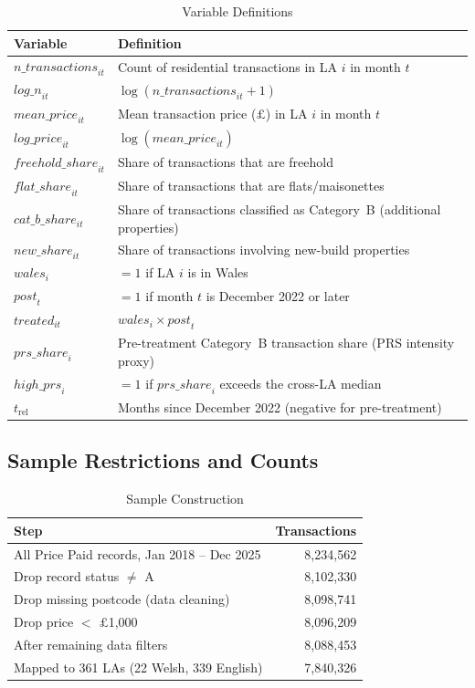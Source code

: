 \documentclass[12pt]{article}
\begin{document}
\begin{table}[H]
\centering
\caption{Variable Definitions}
\label{tab:vardefs}
\begin{tabular}{lp{10cm}}
\toprule
Variable & Definition \\
\midrule
$\mathit{n\_transactions}_{it}$ & Count of residential transactions in LA $i$ in month $t$ \\
$\mathit{log\_n}_{it}$ & $\log(\mathit{n\_transactions}_{it} + 1)$ \\
$\mathit{mean\_price}_{it}$ & Mean transaction price ($\pounds$) in LA $i$ in month $t$ \\
$\mathit{log\_price}_{it}$ & $\log(\mathit{mean\_price}_{it})$ \\
$\mathit{freehold\_share}_{it}$ & Share of transactions that are freehold \\
$\mathit{flat\_share}_{it}$ & Share of transactions that are flats/maisonettes \\
$\mathit{cat\_b\_share}_{it}$ & Share of transactions classified as Category~B (additional properties) \\
$\mathit{new\_share}_{it}$ & Share of transactions involving new-build properties \\
$\mathit{wales}_i$ & $= 1$ if LA $i$ is in Wales \\
$\mathit{post}_t$ & $= 1$ if month $t$ is December 2022 or later \\
$\mathit{treated}_{it}$ & $\mathit{wales}_i \times \mathit{post}_t$ \\
$\mathit{prs\_share}_i$ & Pre-treatment Category~B transaction share (PRS intensity proxy) \\
$\mathit{high\_prs}_i$ & $= 1$ if $\mathit{prs\_share}_i$ exceeds the cross-LA median \\
$t_{\text{rel}}$ & Months since December 2022 (negative for pre-treatment) \\
\bottomrule
\end{tabular}
\end{table}

\subsection{Sample Restrictions and Counts}

\begin{table}[H]
\centering
\caption{Sample Construction}
\label{tab:sample}
\begin{tabular}{lr}
\toprule
Step & Transactions \\
\midrule
All Price Paid records, Jan 2018 -- Dec 2025 & 8,234,562 \\
Drop record status $\neq$ A & 8,102,330 \\
Drop missing postcode (data cleaning) & 8,098,741 \\
Drop price $<$ $\pounds$1,000 & 8,096,209 \\
After remaining data filters & 8,088,453 \\
Mapped to 361 LAs (22 Welsh, 339 English) & 7,840,326 \\
\bottomrule
\end{tabular}
\end{table}
\end{document}
